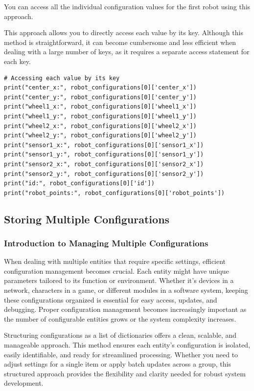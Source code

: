 You can access all the individual configuration values for the first robot using this approach.



This approach allows you to directly access each value by its key. Although this method is straightforward, it can become cumbersome and less efficient when dealing with a large number of keys, as it requires a separate access statement for each key.

\begin{verbatim}
# Accessing each value by its key
print("center_x:", robot_configurations[0]['center_x'])
print("center_y:", robot_configurations[0]['center_y'])
print("wheel1_x:", robot_configurations[0]['wheel1_x'])
print("wheel1_y:", robot_configurations[0]['wheel1_y'])
print("wheel2_x:", robot_configurations[0]['wheel2_x'])
print("wheel2_y:", robot_configurations[0]['wheel2_y'])
print("sensor1_x:", robot_configurations[0]['sensor1_x'])
print("sensor1_y:", robot_configurations[0]['sensor1_y'])
print("sensor2_x:", robot_configurations[0]['sensor2_x'])
print("sensor2_y:", robot_configurations[0]['sensor2_y'])
print("id:", robot_configurations[0]['id'])
print("robot_points:", robot_configurations[0]['robot_points'])
\end{verbatim}

\newpage

\subsection{Storing Multiple Configurations}

\subsubsection{Introduction to Managing Multiple Configurations}
\label{sec:managing_multiple_configuration}
When dealing with multiple entities that require specific settings, efficient configuration management becomes crucial. Each entity might have unique parameters tailored to its function or environment. Whether it's devices in a network, characters in a game, or different modules in a software system, keeping these configurations organized is essential for easy access, updates, and debugging. Proper configuration management becomes increasingly important as the number of configurable entities grows or the system complexity increases.

Structuring configurations as a list of dictionaries offers a clean, scalable, and manageable approach. This method ensures each entity's configuration is isolated, easily identifiable, and ready for streamlined processing. Whether you need to adjust settings for a single item or apply batch updates across a group, this structured approach provides the flexibility and clarity needed for robust system development.

